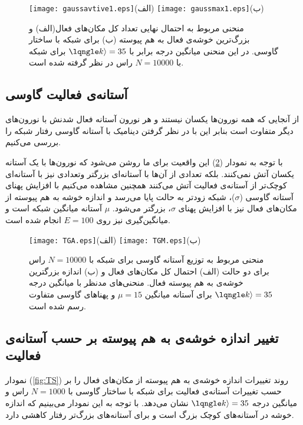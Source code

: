 \begin{figure}[htbp]
\hspace*{0cm}
\texttt{[image: gaussavtive1.eps]}\centering(الف)
\texttt{[image: gaussmax1.eps]}\centering(ب)
\caption [احتمال نهایی تعداد کل مکان‌های فعالو بزرگ‌ترین خوشه‌ی فعال به هم پیوسته برای شبکه  با ساختار گاوسی]{\footnotesize منحنی مربوط به
 احتمال نهایی تعداد کل مکان‌های فعال(الف) و بزرگ‌ترین خوشه‌ی فعال به هم پیوسته (ب) برای شبکه  با ساختار گاوسی.  در این منحنی میانگین درجه برابر با $\lqngle k \rangle  = 35$
 برای شبکه با $N = 10000$ راس در نظر گرفته شده است.}
\label{fig:gaussian}
\end{figure}
\newpage 
 \subsection{آستانه‌ی فعالیت گاوسی}
 از آنجایی که همه نورون‌ها یکسان نیستند و هر نورون آستانه فعال شدنش با نورون‌های دیگر متفاوت است بنابر این با در نظر گرفتن دینامیک با آستانه گاوسی رفتار شبکه را بررسی می‌کنیم.
 
 با توجه به نمودار (\ref{fig:gauss}) این واقعیت برای ما روشن می‌شود که نورون‌ها با یک آستانه یکسان آتش نمی‌کنند. بلکه تعدادی از آن‌ها با آستانه‌ای بزرگتر وتعدادی نیز با آستانه‌ای کوچک‌تر از آستانه‌ی فعالیت آتش می‌کنند همچنین مشاهده می‌کنیم با افزایش پهنای آستانه گاوسی ($\sigma$)، شبکه زودتر به حالت پایا می‌رسد و اندازه خوشه به هم پیوسته از مکان‌های فعال  نیز با افزایش پهنای  $\sigma$، بزرگتر می‌شود. $\mu$ آستانه میانگین شبکه  است و میانگین‌گیری نیز روی $E=100$ انجام شده است.
\begin{figure}[htbp] 
\hspace*{0cm}
\centering
\texttt{[image: TGA.eps]}\centering(الف)    
\texttt{[image: TGM.eps]}\centering(ب)
\caption [منحنی مربوط به توزیع آستانه گاوسی]{\footnotesize
 منحنی مربوط به توزیع آستانه گاوسی برای شبکه با $N=10000$ راس برای دو حالت (الف) احتمال کل مکان‌های فعال و (ب) اندازه بزرگترین خوشه‌ی به هم پیوسته فعال. منحنی‌های مدنظر با میانگین درجه $\lqngle k \rangle = 35$   برای آستانه میانگین  $\mu = 15$ و پهنا‌های گاوسی متفاوت رسم شده است.}
\label{fig:gauss}
\end{figure}

\newpage
\subsection{تغییر اندازه خوشه‌ی به هم پیوسته بر حسب آستانه‌ی فعالیت}
نمودار (\ref{fig:TS})  روند تغییرات اندازه خوشه‌ی به هم پیوسته از مکان‌‌های فعال را بر حسب تغییرات آستانه‌ی فعالیت برای شبکه با ساختار گاوسی با $N=1000$ راس و میانگین درجه $\lqngle k \rangle = 35$  نشان می‌دهد. با توجه به این نمودار می‌بینیم که اندازه خوشه در آستانه‌های کوچک بزرگ است و برای آستانه‌‌های بزرگ‌تر رفتار کاهشی دارد.

